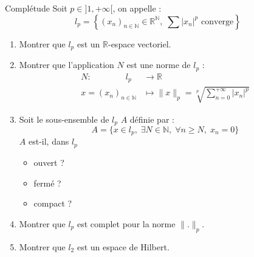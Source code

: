 \begin{question}{Complétude}{}
  Soit $p \in ]1, + \infty[$, on appelle : 
  \begin{equation}
    l_p = \left\{ (x_n) _{n \in \mathbb{N}} \in \mathbb{R} ^{\mathbb{N}}, \; \sum |x_n| ^{p} \text{ converge}\right\}
  \end{equation}

  \begin{enumerate}
    \item Montrer que $l_p$ est un $\mathbb{R}$-espace vectoriel.
    \item Montrer que l'application $N$ est une norme de $l_p$ :
      \begin{align}
        N :\quad\quad\quad\quad l_p &\to \mathbb{R} \\ 
        x = (x_n) _{n \in \mathbb{N}} &\mapsto \| x \| _ p = \sqrt[p]{ \sum_{n=0}^{+ \infty}|x_n| ^{p}}
      \end{align}

    \item Soit le sous-ensemble de $l_p$ $A$ définie par : 
      \begin{equation}
        A = \{x \in l_p,\; \exists N \in \mathbb{N}, \; \forall n \ge N,\; x_n = 0\}
      \end{equation}
      $A$ est-il, dans $l_p$
      \begin{itemize}

          \item ouvert ?
          \item fermé ? 
          \item compact ?

      \end{itemize}

    \item Montrer que $l_p$ est complet pour la norme $\| . \|_p$. 
    \item Montrer que $l_2$ est un espace de Hilbert.
  \end{enumerate}
\end{question}

